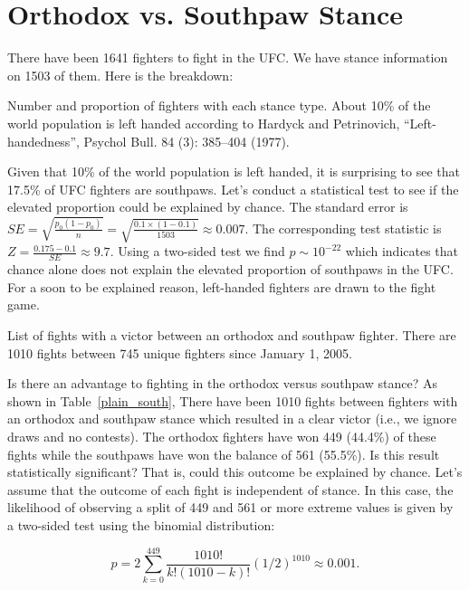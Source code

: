 \clearpage
\section{Orthodox vs. Southpaw Stance}
There have been 1641 fighters to fight in the UFC. We have stance information on 1503 of them. Here is the
breakdown:

\begin{table}[h]

\caption{Number and proportion of fighters with each stance type. About 10\% of the
world population is left handed according to Hardyck and Petrinovich, ``Left-handedness'', Psychol Bull. 84 (3): 385–404 (1977).}
\end{table}

Given that 10\% of the world population is left handed, it is surprising to see that 17.5\%
of UFC fighters are southpaws. Let's conduct a statistical test to see if the elevated
proportion could be explained by chance.
The standard error is $SE = \sqrt{\frac{p_0(1-p_0)}{n}}=\sqrt{\frac{0.1\times(1 - 0.1)}{1503}}\approx0.007$.
The corresponding test statistic is $Z = \frac{0.175 - 0.1}{SE}\approx9.7$. Using a two-sided test
we find $p \sim 10^{-22}$ which indicates that chance alone does not explain the elevated proportion of southpaws in the UFC.
For a soon to be explained reason, left-handed fighters are drawn to the fight game.

\begin{table}[h]

\caption{List of fights with a victor between an orthodox and southpaw fighter. There are 1010 fights between 745 unique fighters
since January 1, 2005.}
\label{plain_south}
\end{table}

Is there an advantage to fighting in the orthodox versus southpaw stance?
As shown in Table~\ref{plain_south}, There have been 1010 fights between fighters with an orthodox and southpaw stance which resulted in a clear victor (i.e., we ignore draws and no contests). The orthodox fighters have won 449 (44.4\%) of these fights while the southpaws have won the balance of 561 (55.5\%). Is this result statistically significant? That is, could this outcome be explained by chance. Let's assume that the outcome of each fight is independent of stance. In this case, the likelihood of observing a split of 449 and 561 or more extreme values is given by a two-sided test using the binomial distribution:

\begin{equation}
p = 2\sum_{k=0}^{449} \frac{1010!}{k! (1010-k)!}(1/2)^{1010} \approx 0.001.
\end{equation}

